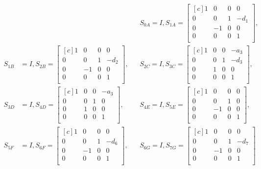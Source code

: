 \documentclass{article}
\begin{document}
\begin{align*}
\phantom{T_{01}}&%
&& S_{0A} = I,
S_{1A} =
\begin{bmatrix*}[c]
1 & 0 & 0 & 0 \\
0 & 0 & 1 & -d_1 \\
0 & -1 & 0 & 0 \\
0 & 0 & 0 & 1 \\
\end{bmatrix*}, \\
S_{1B} &= I,
S_{2B} =
\begin{bmatrix*}[c]
1 & 0 & 0 & 0 \\
0 & 0 & 1 & -d_2 \\
0 & -1 & 0 & 0 \\
0 & 0 & 0 & 1 \\
\end{bmatrix*},
&& S_{2C} = I,
S_{3C} =
\begin{bmatrix*}[c]
1 & 0 & 0 & -a_3 \\
0 & 0 & 1 & -d_3 \\
0 & 1 & 0 & 0 \\
0 & 0 & 0 & 1 \\
\end{bmatrix*}, \\
S_{3D} &= I,
S_{4D} =
\begin{bmatrix*}[c]
1 & 0 & 0 & -a_3 \\
0 & 0 & 1 & 0 \\
0 & 1 & 0 & 0 \\
0 & 0 & 0 & 1 \\
\end{bmatrix*},
&& S_{4E} = I,
S_{5E} =
\begin{bmatrix*}[c]
1 & 0 & 0 & 0 \\
0 & 0 & 1 & 0 \\
0 & -1 & 0 & 0 \\
0 & 0 & 0 & 1 \\
\end{bmatrix*}, \\
S_{5F} &= I,
S_{6F} =
\begin{bmatrix*}[c]
1 & 0 & 0 & 0 \\
0 & 0 & 1 & -d_6 \\
0 & -1 & 0 & 0 \\
0 & 0 & 0 & 1 \\
\end{bmatrix*},
&& S_{6G} = I,
S_{7G} =
\begin{bmatrix*}[c]
1 & 0 & 0 & 0 \\
0 & 0 & 1 & -d_7 \\
0 & -1 & 0 & 0 \\
0 & 0 & 0 & 1 \\
\end{bmatrix*}
\end{align*}
\end{document}
